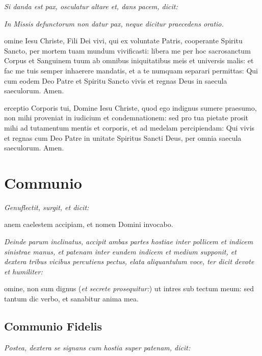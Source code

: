 \textit{Si danda est pax, osculatur altare et, dans pacem, dicit:}


\divisio

\textit{In Missis defunctorum non datur pax, neque dicitur praecedens oratio.}

\divisio

omine Iesu Christe, Fili Dei vivi, qui ex voluntate Patris,
cooperante Spiritu Sancto, per mortem tuam mundum vivificasti: libera me per hoc
sacrosanctum Corpus et Sanguinem tuum ab omnibus iniquitatibus meis et universis
malis: et fac me tuis semper inhaerere mandatis, et a te numquam separari
permittas: Qui cum eodem Deo Patre et Spiritu Sancto vivis et regnas Deus in
saecula saeculorum.  Amen.

erceptio Corporis tui, Domine Iesu Christe, quod ego indignus
sumere praesumo, non mihi proveniat in iudicium et condemnationem: sed pro tua
pietate prosit mihi ad tutamentum mentis et corporis, et ad medelam
percipiendam: Qui vivis et regnas cum Deo Patre in unitate Spiritus Sancti Deus,
per omnia saecula saeculorum.  Amen.

\section{Communio}

\textit{Genuflectit, surgit, et dicit:}

anem caelestem accipiam, et nomen Domini invocabo.

\textit{%
    Deinde parum inclinatus, accipit ambas partes hostiae inter pollicem et
    indicem sinistrae manus, et patenam inter eundem indicem et medium supponit,
    et dextera tribus vicibus percutiens pectus, elata aliquantulum voce, ter
    dicit devote et humiliter:
}

\sinus\sinus\sinus


omine, non sum dignus (\textit{et secrete prosequitur:}) ut intres
sub tectum meum: sed tantum dic verbo, et sanabitur anima mea.

\subsection{Communio Fidelis}

\textit{Postea, dextera se signans cum hostia super patenam, dicit:}

